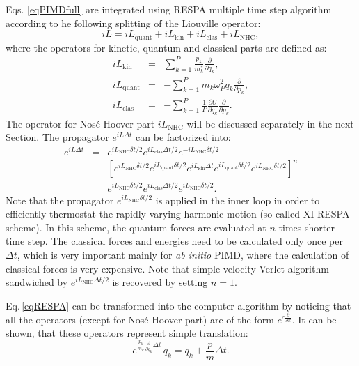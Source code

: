 Eqs. \ref{eqPIMDfull} are integrated using RESPA multiple time step algorithm according to he following splitting of the Liouville operator:
\begin{equation}
iL = iL_{\mathrm{quant}}+iL_{\mathrm{kin}}+iL_{\mathrm{clas}}+iL_{\mathrm{NHC}}  ,
\end{equation}
where the operators for kinetic, quantum and classical parts are defined as:
\begin{eqnarray}
iL_{\mathrm{kin}} 	&=& \sum^P_{k=1}\frac{p_k}{m_k^*}\frac{\partial}{\partial q_k}  ,\\
iL_{\mathrm{quant}} 	&=& -\sum^P_{k=1} m_k\omega^2_P q_k\frac{\partial}{\partial p_k}  ,\\
iL_{\mathrm{clas}}  	&=& -\sum^P_{k=1}\frac{1}{P}\frac{\partial U}{\partial q_k}\frac{\partial}{\partial p_k}   .
\end{eqnarray}
The operator for Nosé-Hoover part $iL_{\mathrm{NHC}}$ will be discussed separately in the next Section. The propagator $e^{iL\Delta t}$ can be factorized into: 
\begin{eqnarray}
\label{eqRESPA}
e^{iL\Delta t}&=&e^{iL_{\mathrm{NHC}}\delta t/2}e^{iL_{\mathrm{clas}}\Delta t/2}e^{-iL_{\mathrm{NHC}}\delta t/2}\\
& &\left[e^{iL_{\mathrm{NHC}}\delta t/2}e^{iL_{\mathrm{quant}}\delta t/2}e^{iL_{\mathrm{kin}}\Delta t} e^{iL_{\mathrm{quant}}\delta t/2}e^{iL_{\mathrm{NHC}}\delta t/2}\right]^n \nonumber \\
& & e^{iL_{\mathrm{NHC}}\delta t/2}e^{iL_{\mathrm{clas}}\Delta t/2}e^{iL_{\mathrm{NHC}}\delta t/2}  . \nonumber
\end{eqnarray}
Note that the propagator $e^{iL_{\mathrm{NHC}}\delta t/2}$ is applied in the inner loop in order to efficiently thermostat the rapidly varying harmonic motion (so called XI-RESPA scheme).
In this scheme, the quantum forces are evaluated at $n$-times shorter time step. The classical forces and energies need to be calculated only once per $\Delta t$, which is very important mainly for \textit{ab initio} PIMD, where the calculation of classical forces is very expensive. Note that simple velocity Verlet algorithm sandwiched by $e^{iL_{\mathrm{NHC}}\Delta t/2}$ is recovered by setting $n=1$. 

Eq.\,\ref{eqRESPA} can be transformed into the computer algorithm by noticing  that all the operators (except for Nosé-Hoover part) are of the form $e^{c\frac{\partial}{\partial x}}$. It can be shown, that these operators represent simple translation\cite{Tuckerman_book}:
$$ e^{\frac{p_k}{m_k}\frac{\partial}{\partial q_k}\Delta t}\,q_k =q_k + \frac{p}{m}\Delta t   .$$

